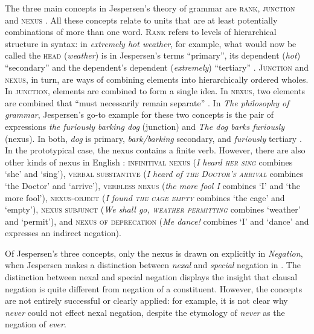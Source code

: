 \documentclass[output=chapter]{langscibook}
\begin{document}
The three main concepts in Jespersen’s theory of grammar are \textsc{rank}, \textsc{junction} and \textsc{nexus} \citep{Jespersen1924,Francis1989}. All these concepts relate to units that are at least potentially combinations of more than one word. \textsc{Rank} refers to levels of hierarchical structure in syntax: in \textit{extremely hot weather}, for example, what would now be called the \textsc{head} (\textit{weather}) is in Jespersen’s terms ``primary'', its dependent (\textit{hot}) ``secondary'' and the dependent’s dependent (\textit{extremely}) ``tertiary'' \citep[96]{Jespersen1924}. \textsc{Junction} and \textsc{nexus}, in turn, are ways of combining elements into hierarchically ordered wholes. In \textsc{junction}, elements are combined to form a single idea. In \textsc{nexus}, two elements are combined that ``must necessarily remain separate'' \citep[116]{Jespersen1924}. In \textit{The philosophy of grammar}, Jespersen’s go-to example for these two concepts is the pair of expressions \textit{the furiously barking dog} (junction) and \textit{The dog barks furiously} (nexus). In both, \textit{dog} is primary, \textit{bark/barking} secondary, and \textit{furiously} tertiary \citep[97,~114]{Jespersen1924}. In the prototypical case, the nexus contains a finite verb. However, there are also other kinds of nexus in English \citep[117--131]{Jespersen1924}: \textsc{infinitival nexus} (\textit{I heard \textsc{her sing}} combines `she’ and `sing’), \textsc{verbal substantive} (\textit{I heard of \textsc{the Doctor’s arrival}} combines `the Doctor’ and `arrive’), \textsc{verbless nexus} (\textit{the more fool I} combines `I’ and `the more fool’), \textsc{nexus-object} (\textit{I found \textsc{the cage empty}} combines `the cage’ and `empty’), \textsc{nexus subjunct} (\textit{We shall go, \textsc{weather permitting}} combines `weather’ and `permit’), and \textsc{nexus of deprecation} (\textit{Me dance!} combines `I’ and `dance’ and expresses an indirect negation).

Of Jespersen’s three concepts, only the nexus is drawn on explicitly in \textit{Negation}, when Jespersen makes a distinction between \textit{nexal} and \textit{special} negation in . The distinction between nexal and special negation displays the insight that clausal negation is quite different from negation of a constituent. However, the concepts are not entirely successful or clearly applied: for example, it is not clear why \textit{never} could not effect nexal negation, despite the etymology of \textit{never} as the negation of \textit{ever}.
\end{document}
